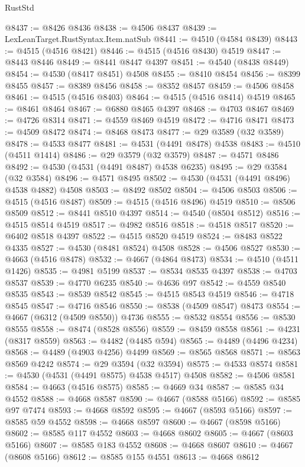 \begin{lexlean}{RustStd}
\begin{coremodule}
@8437 := @8426 @8436
@8438 := @4506 @8437
@8439 := LexLeanTarget.RustSyntax.Item.natSub
@8441 := @4510 (@4584 @8439)
@8443 := @4515 (@4516 @8421)
@8446 := @4515 (@4516 @8430) @4519
@8447 := @8443 @8446
@8449 := @8441 @8447 @4397
@8451 := @4540 (@8438 @8449)
@8454 := @4530 (@8417 @8451) @4508
@8455 := @8410 @8454
@8456 := @8399 @8455
@8457 := @8389 @8456
@8458 := @8352 @8457
@8459 := @4506 @8458
@8461 := @4515 (@4516 @8403)
@8464 := @4515 (@4516 @8414) @4519
@8465 := @8461 @8464
@8467 := @6880 @8465 @4397
@8468 := @4703 @8467
@8469 := @4726 @8314
@8471 := @4559 @8469 @4519
@8472 := @4716 @8471
@8473 := @4509 @8472
@8474 := @8468 @8473
@8477 := @29 @3589 (@32 @3589)
@8478 := @4533 @8477
@8481 := @4531 (@4491 @8478) @4538
@8483 := @4510 (@4511 @1414)
@8486 := @29 @3579 (@32 @3579)
@8487 := @4571 @8486
@8492 := @4530 (@4531 (@4491 @8487) @4538 @6235)
@8495 := @29 @3584 (@32 @3584)
@8496 := @4571 @8495
@8502 := @4530 (@4531 (@4491 @8496) @4538 @4882) @4508
@8503 := @8492 @8502
@8504 := @4506 @8503
@8506 := @4515 (@4516 @8487)
@8509 := @4515 (@4516 @8496) @4519
@8510 := @8506 @8509
@8512 := @8441 @8510 @4397
@8514 := @4540 (@8504 @8512)
@8516 := @4515 @8514 @4519
@8517 := @4982 @8516
@8518 := @4518 @8517
@8520 := @6402 @8518 @4397
@8522 := @4515 @8520 @4519
@8524 := @8483 @8522 @4335
@8527 := @4530 (@8481 @8524) @4508
@8528 := @4506 @8527
@8530 := @4663 (@4516 @8478)
@8532 := @4667 (@4864 @8473)
@8534 := @4510 (@4511 @1426)
@8535 := @4981 @5199
@8537 := @8534 @8535 @4397
@8538 := @4703 @8537
@8539 := @4770 @6235
@8540 := @4636 @97
@8542 := @4559 @8540 @8535
@8543 := @8539 @8542
@8545 := @4515 @8543 @4519
@8546 := @4718 @8545
@8547 := @4716 @8546
@8550 := @8538 (@4509 @8547) @8473
@8554 := @4667 (@6312 (@4509 @8550)) @4736
@8555 := @8532 @8554
@8556 := @8530 @8555
@8558 := @8474 (@8528 @8556)
@8559 := @8459 @8558
@8561 := @4231 (@8317 @8559)
@8563 := @4482 (@4485 @594)
@8565 := @4489 (@4496 @4234)
@8568 := @4489 (@4903 @4256) @4499
@8569 := @8565 @8568
@8571 := @8563 @8569 @4242
@8574 := @29 @3594 (@32 @3594)
@8575 := @4533 @8574
@8581 := @4530 (@4531 (@4491 @8575) @4538 @4517) @4508
@8582 := @4506 @8581
@8584 := @4663 (@4516 @8575)
@8585 := @4669 @34
@8587 := @8585 @34 @4552
@8588 := @4668 @8587
@8590 := @4667 (@8588 @5166)
@8592 := @8585 @97 @7474
@8593 := @4668 @8592
@8595 := @4667 (@8593 @5166)
@8597 := @8585 @59 @4552
@8598 := @4668 @8597
@8600 := @4667 (@8598 @5166)
@8602 := @8585 @117 @4552
@8603 := @4668 @8602
@8605 := @4667 (@8603 @5166)
@8607 := @8585 @183 @4552
@8608 := @4668 @8607
@8610 := @4667 (@8608 @5166)
@8612 := @8585 @155 @4551
@8613 := @4668 @8612

\end{coremodule}
\end{lexlean}
